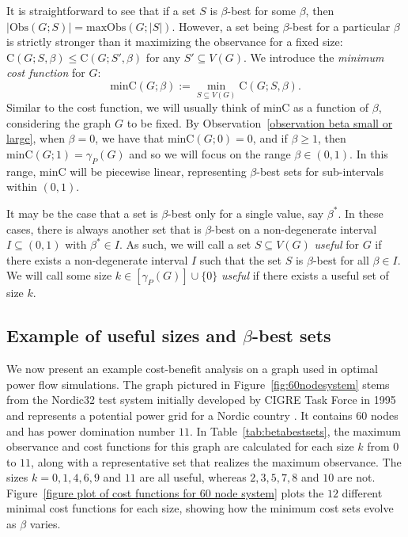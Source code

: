 \documentclass{article}
\begin{document}
        It is straightforward to see that if a set $S$ is $\beta$-best for some $\beta$, then $|\mathrm{Obs}(G;S)|=\mathrm{maxObs}(G;|S|)$.
        However, a set being $\beta$-best for a particular $\beta$ is strictly stronger than it maximizing the observance for a fixed size: $\mathrm{C}(G;S,\beta) \leq \mathrm{C}(G;S',\beta)$ for any $S'\subseteq V(G)$.
        We introduce the \emph{minimum cost function} for $G$:
        \[
        \mathrm{minC}(G;\beta):=\min_{S\subseteq V(G)}\mathrm{C}(G;S,\beta).
        \]
        Similar to the cost function, we will usually think of $\mathrm{minC}$ as a function of $\beta$, considering the graph $G$ to be fixed.
        By Observation~\ref{observation beta small or large}, when $\beta=0$, we have that $\mathrm{minC}(G;0)=0$, and if $\beta\geq 1$, then $\mathrm{minC}(G;1)=\gamma_P(G)$ and so we will focus on the range $\beta\in (0,1)$.
        In this range, $\mathrm{minC}$ will be piecewise linear, representing $\beta$-best sets for sub-intervals within $(0,1)$.
        
        It may be the case that a set is $\beta$-best only for a single value, say $\beta^*$.
        In these cases, there is always another set that is $\beta$-best on a non-degenerate interval $I\subseteq (0,1)$ with $\beta^*\in I$.
        As such, we will call a set $S\subseteq V(G)$ \emph{useful} for $G$ if there exists a non-degenerate interval $I$ such that the set $S$ is $\beta$-best for all $\beta\in I$.
        We will call some size $k\in [\gamma_P(G)]\cup \{0\}$ \emph{useful} if there exists a useful set of size $k$.
        
    
    \subsection{Example of useful sizes and \texorpdfstring{$\beta$}{beta}-best sets}
        We now present an example cost-benefit analysis on a graph used in optimal power flow simulations.
        The graph pictured in Figure~\ref{fig:60nodesystem} stems from the Nordic32 test system initially developed by CIGRE Task Force in 1995 \cite{S1995} and represents a potential power grid for a Nordic country \cite{C2020}.
        It contains $60$ nodes and has power domination number $11$.
        In Table~\ref{tab:betabestsets}, the maximum observance and cost functions for this graph are calculated for each size $k$ from $0$ to $11$, along with a representative set that realizes the maximum observance.
        The sizes $k=0,1,4,6,9$ and $11$ are all useful, whereas $2,3,5,7,8$ and $10$ are not.
        Figure~\ref{figure plot of cost functions for 60 node system} plots the $12$ different minimal cost functions for each size, showing how the minimum cost sets evolve as $\beta$ varies.
\end{document}
